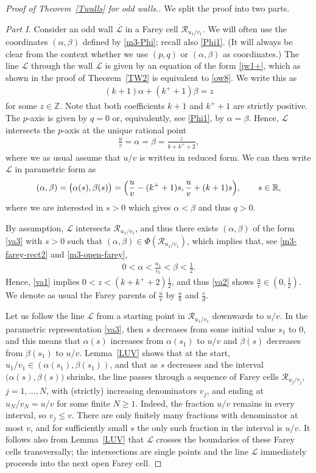 \documentclass[11pt,reqno,tbtags,a4paper]{amsart}
\numberwithin{equation}{section}
\renewcommand\le{\leq}
\renewcommand\ge{\geq}
\renewcommand\leq{\leqslant}
\renewcommand\geq{\geqslant}
\theoremstyle{plain}%
\theoremstyle{definition}
\theoremstyle{remark}
\newcommand{\refT}[1]{Theorem~\ref{#1}}
\newcommand{\refL}[1]{Lemma~\ref{#1}}
\newcommand\bigpar[1]{\bigl(#1\bigr)}
\newcommand\Bigpar[1]{\Bigl(#1\Bigr)}
\newcommand\bbR{\mathbb R}
\newcommand\bbZ{\mathbb Z}
\newcommand\ga{\alpha}
\newcommand\gb{\beta}
\newcommand\LL{{\mathcal L}}
\newcommand\LLL{{\overline\LL}} %
\newcommand\cR{{\mathcal R}}
\newcommand\uvx[1]{_{u_{#1}/v_{#1}}}
\newcommand\kx{{k^+}}
\newcommand\0{{\boldsymbol 0}}
\newcommand\1{{\boldsymbol 1}}
\begin{document}
\begin{proof}[Proof of \refT{Twalls} for odd walls.]
We split the proof into two parts.

\medskip
\noindent\emph{Part I.}
Consider an odd wall $\LLL$ in a Farey cell $\cR\uvx1$.
We will often use the coordinates $(\ga,\gb)$ defined by \eqref{m3-Phi};
recall also \eqref{Phi1}. 
(It will always be clear from the context whether we use $(p,q)$ or
$(\ga,\gb)$ as coordinates.) 
The line $\LL$ through the wall $\LLL$ 
is given by an equation of the form \eqref{jw1+}, which as shown in the
proof of \refT{TW2} is equivalent to  \eqref{ow8}. We write this as
\begin{align}\label{va1}
(k+1)\ga +(\kx+1)\gb = z
\end{align}
for some $z\in\bbZ$. %
Note that both coefficients $k+1$ and $\kx+1$ are strictly positive.
The $p$-axis is given by $q=0$ or, equivalently, see \eqref{Phi1}, by $\ga=\gb$.
Hence, $\LL$ intersects the $p$-axis at the unique rational point
\begin{align}\label{va2}
  \frac{u}v=\ga=\gb=\frac{z}{k+\kx+2},
\end{align}
where we as usual assume that $u/v$ is written in reduced form.
We can then write $\LL$ in parametric form as
\begin{align}\label{va3}
(\ga,\gb)=\bigpar{\ga(s),\gb(s)}=\Bigpar{\frac{u}v -(\kx+1)s,\frac{u}v+(k+1)s},
\qquad s\in\bbR,  
\end{align}
where we are interested in $s>0$ which gives $\ga<\gb$ and thus $q>0$.

By assumption, $\LL$ intersects $\cR\uvx1$, and thus there exists $(\ga,\gb)$
of the form \eqref{va3} with $s>0$ such that $(\ga,\gb)\in\Phi(\cR\uvx1)$,
which implies that, see \eqref{m3-farey-rect2} and \eqref{m3-open-farey},
\begin{align}\label{va4}
  0 < \ga < \frac{u_1}{v_1} <\gb <\frac12.
\end{align}
Hence, \eqref{va1} implies $0<z<(k+\kx+2)\frac12$, and thus \eqref{va2} shows
$\frac{u}v\in(0,\frac12)$. We denote as usual the Farey parents of
$\frac{u}v$ by $\frac{a}b$ and $\frac{c}d$.

Let us follow the line $\LL$ from a starting point in $\cR\uvx1$ downwards
to $u/v$. In the parametric representation \eqref{va3}, then $s$ decreases
from some initial value $s_1$ to 0, and this means that $\ga(s)$ 
increases from $\ga(s_1)$
to $u/v$ and $\gb(s)$ decreases from $\gb(s_1)$ 
to $u/v$. \refL{LUV} shows that at the start, 
$u_1/v_1\in(\ga(s_1),\gb(s_1))$, and that as $s$ decreases and the interval 
$\bigpar{\ga(s),\gb(s)}$ shrinks, the line passes through a sequence of
Farey cells $\cR\uvx{j}$, $j=1,\dots,N$, with (strictly)
increasing denominators $v_j$,
and ending at $u_N/v_N=u/v$ for some finite $N\ge1$.
Indeed, the fraction $u/v$ remains in every interval, so $v_j\le v$.
There are only finitely many fractions with denominator at most $v$,
and for sufficiently small $s$ the only such fraction in the interval is $u/v$.
It follows also from \refL{LUV} that $\LL$ crosses the boundaries of these
Farey cells transversally; the intersections are single points and the 
line $\LL$
immediately proceeds into the next open Farey cell.


\end{proof}
\end{document}
